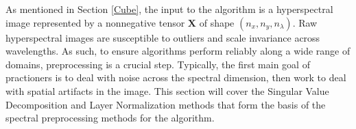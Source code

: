 As mentioned in Section \ref{Cube}, the input to the algorithm is a hyperspectral image represented by a nonnegative tensor $\mathbf{X}$  of shape $(n_x, n_y, n_\lambda)$. Raw hyperspectral images are susceptible to outliers and scale invariance across wavelengths. As such, to ensure algorithms perform reliably along a wide range of domains, preprocessing is a crucial step. Typically, the first main goal of practioners is to deal with noise across the spectral dimension, then work to deal with spatial artifacts in the image. This section will cover the Singular Value Decomposition and Layer Normalization methods that form the basis of the spectral preprocessing methods for the algorithm.


